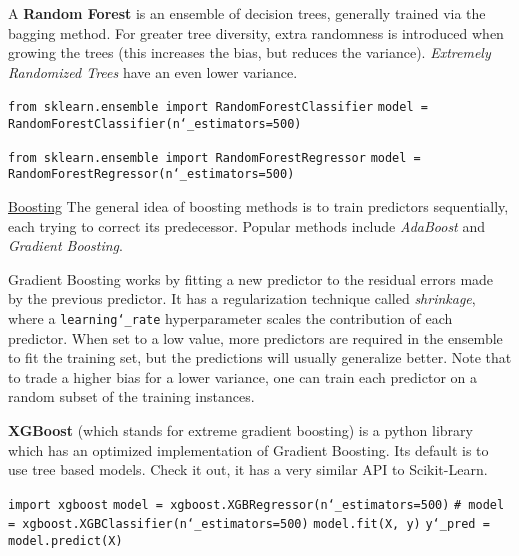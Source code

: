 A \textbf{Random Forest} is an ensemble of decision trees,
generally trained via the bagging method.
For greater tree diversity,
extra randomness is introduced when growing the trees
(this increases the bias, but reduces the variance).
\textit{Extremely Randomized Trees} have an even lower variance.

\texttt{from sklearn.ensemble import RandomForestClassifier}\newline
\texttt{model = RandomForestClassifier(n\char`_estimators=500)}

\texttt{from sklearn.ensemble import RandomForestRegressor}\newline
\texttt{model = RandomForestRegressor(n\char`_estimators=500)}\newline

\underline{Boosting}\newline
The general idea of boosting methods is to train predictors sequentially,
each trying to correct its predecessor.
Popular methods include \textit{AdaBoost} and \textit{Gradient Boosting}.

Gradient Boosting works by fitting a new predictor
to the residual errors made by the previous predictor.
% 
It has a regularization technique called \textit{shrinkage},
where a \texttt{learning\char`_rate} hyperparameter scales the contribution of each predictor.
When set to a low value,
more predictors are required in the ensemble to fit the training set,
but the predictions will usually generalize better.
% 
Note that to trade a higher bias for a lower variance,
one can train each predictor on a random subset of the training instances.

\textbf{XGBoost} (which stands for extreme gradient boosting)
is a python library which has an \newline optimized implementation of Gradient Boosting.
Its default is to use tree based models.\newline
Check it out, it has a very similar API to Scikit-Learn.

\texttt{import xgboost}\newline
\newline
\texttt{model = xgboost.XGBRegressor(n\char`_estimators=500)}\newline
\texttt{\# model = xgboost.XGBClassifier(n\char`_estimators=500)}\newline
\newline
\texttt{model.fit(X, y)}\newline
\texttt{y\char`_pred = model.predict(X)}

